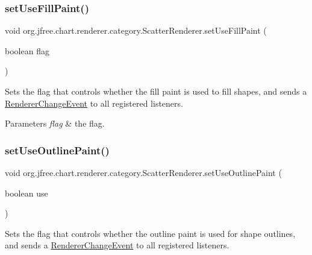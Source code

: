 \subsubsection{\texorpdfstring{set\+Use\+Fill\+Paint()}{setUseFillPaint()}}
{\footnotesize\ttfamily void org.\+jfree.\+chart.\+renderer.\+category.\+Scatter\+Renderer.\+set\+Use\+Fill\+Paint (\begin{DoxyParamCaption}\item[{boolean}]{flag }\end{DoxyParamCaption})}

Sets the flag that controls whether the fill paint is used to fill shapes, and sends a \mbox{\hyperlink{}{Renderer\+Change\+Event}} to all registered listeners.


\begin{DoxyParams}{Parameters}
{\em flag} & the flag. \\
\hline
\end{DoxyParams}
\mbox{\label{classorg_1_1jfree_1_1chart_1_1renderer_1_1category_1_1_scatter_renderer_a12757d38eaca9521a3f7770a984cfc9b}} 
\subsubsection{\texorpdfstring{set\+Use\+Outline\+Paint()}{setUseOutlinePaint()}}
{\footnotesize\ttfamily void org.\+jfree.\+chart.\+renderer.\+category.\+Scatter\+Renderer.\+set\+Use\+Outline\+Paint (\begin{DoxyParamCaption}\item[{boolean}]{use }\end{DoxyParamCaption})}

Sets the flag that controls whether the outline paint is used for shape outlines, and sends a \mbox{\hyperlink{}{Renderer\+Change\+Event}} to all registered listeners.


